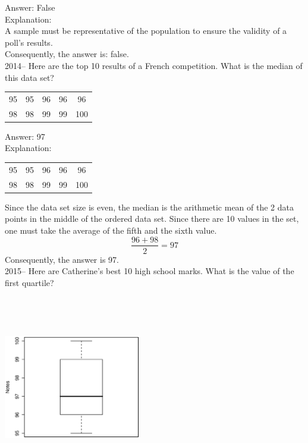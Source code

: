 \documentclass[letterpaper, 12pt]{article}
\begin{document}
Answer: False\\

Explanation:\\
A sample must be representative of the population to ensure the validity of a poll's results.\\
Consequently, the answer is: false.\\


2014-- Here are the top 10 results of a French competition. What is the median of this data set?  \\
\begin{center}
 \begin{tabular}{|c  c  c  c  c|} \hline

95 & 95 & 96 & 96 & 96 \\
98 & 98 & 99 & 99 & 100 \\ \hline

\end{tabular}
\end{center}

Answer: 97\\

Explanation:\\
\begin{center}
 \begin{tabular}{|c  c  c  c  c|} \hline

95 & 95 & 96 & 96 & 96 \\
98 & 98 & 99 & 99 & 100 \\ \hline

\end{tabular}
\end{center}
Since the data set size is even, the median is the arithmetic mean of the 2 data points in the middle of the ordered data set. Since there are 10 values in the set, one must take the average of the fifth and the sixth value.\\
\begin{equation*}
 \frac{96+98}{2}=97
\end{equation*}
Consequently, the answer is 97.\\

2015-- Here are Catherine's best 10 high school marks. What is the value of the first quartile?
\begin{center}
 \includegraphics[width=6cm,height=8cm,angle=-90]{Q2015.eps}
\end{center}
\end{document}

